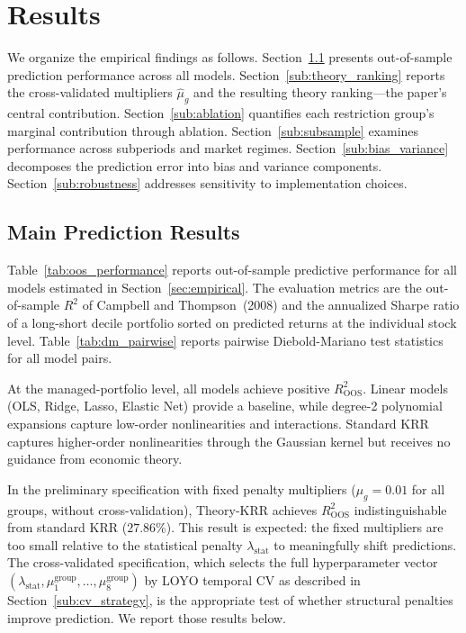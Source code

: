 
\section{Results}\label{sec:results}

We organize the empirical findings as follows.
Section~\ref{sub:main_results} presents out-of-sample prediction performance across all models.
Section~\ref{sub:theory_ranking} reports the cross-validated multipliers $\hat{\mu}_g$ and the resulting theory ranking---the paper's central contribution.
Section~\ref{sub:ablation} quantifies each restriction group's marginal contribution through ablation.
Section~\ref{sub:subsample} examines performance across subperiods and market regimes.
Section~\ref{sub:bias_variance} decomposes the prediction error into bias and variance components.
Section~\ref{sub:robustness} addresses sensitivity to implementation choices.


\subsection{Main Prediction Results}\label{sub:main_results}

Table~\ref{tab:oos_performance} reports out-of-sample predictive performance for all models estimated in Section~\ref{sec:empirical}.
The evaluation metrics are the out-of-sample $R^2$ of Campbell and Thompson~(2008) and the annualized Sharpe ratio of a long-short decile portfolio sorted on predicted returns at the individual stock level.
Table~\ref{tab:dm_pairwise} reports pairwise Diebold-Mariano test statistics for all model pairs.

At the managed-portfolio level, all models achieve positive $R^2_{\text{OOS}}$.
Linear models (OLS, Ridge, Lasso, Elastic Net) provide a baseline, while degree-2 polynomial expansions capture low-order nonlinearities and interactions.
Standard KRR captures higher-order nonlinearities through the Gaussian kernel but receives no guidance from economic theory.

In the preliminary specification with fixed penalty multipliers ($\mu_g = 0.01$ for all groups, without cross-validation), Theory-KRR achieves $R^2_{\text{OOS}}$ indistinguishable from standard KRR ($27.86$\%).
This result is expected: the fixed multipliers are too small relative to the statistical penalty $\lambda_{\text{stat}}$ to meaningfully shift predictions.
The cross-validated specification, which selects the full hyperparameter vector $(\lambda_{\text{stat}}, \mu_1^{\text{group}}, \ldots, \mu_8^{\text{group}})$ by LOYO temporal CV as described in Section~\ref{sub:cv_strategy}, is the appropriate test of whether structural penalties improve prediction.
We report those results below.

